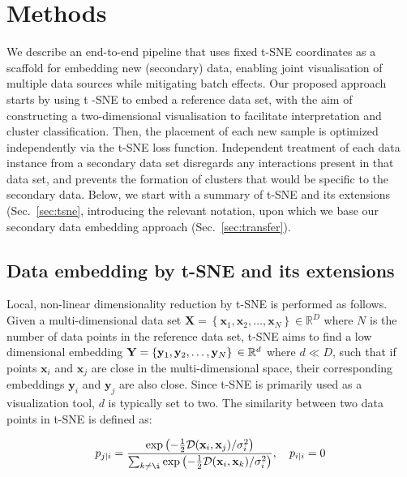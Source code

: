 \documentclass[runningheads]{llncs}
\begin{document}
\section{Methods}

We describe an end-to-end pipeline that uses fixed t-SNE coordinates as a scaffold for
embedding new (secondary) data, enabling joint visualisation of multiple data sources
while mitigating batch effects. Our proposed approach starts by using t\nobreakdash
-SNE to embed a reference data set, with the aim of constructing a
two-dimensional visualisation to facilitate interpretation and cluster
classification. Then, the placement of each new sample is
optimized independently via the
t\nobreakdash -SNE loss function. Independent treatment of each data instance from
a secondary data set disregards any interactions present in that data set, and
prevents the formation of clusters that would be specific to the secondary data. Below, we start
with a summary of t-SNE and its extensions (Sec.~\ref{sec:tsne}, introducing
the relevant notation, upon which we base our secondary data embedding
approach (Sec.~\ref{sec:transfer}).


\subsection{Data embedding by t-SNE and its extensions\label{sec:tsne}}

Local, non-linear dimensionality reduction by t-SNE is performed as follows.
Given a multi-dimensional data set $\mathbf{X} =
\left \{ \mathbf{x}_1, \mathbf{x}_2, \dots, \mathbf{x}_N \right \} \in
\mathbb{R}^D$ where $N$ is the number of data points in the reference data set,
t-SNE aims to find a low dimensional embedding $\mathbf{Y} = \left \{
\mathbf{y}_1, \mathbf{y}_2, \dots, \mathbf{y}_N \right \} \\\in \mathbb{R}^d$
where $d \ll D$, such that if points $\mathbf{x}_i$ and $\mathbf{x}_j$ are
close in the multi-dimensional space, their corresponding embeddings
$\mathbf{y}_i$ and $\mathbf{y}_j$ are also close. Since t-SNE is primarily used
as a visualization tool, $d$ is typically set to two. The similarity between
two data points in t-SNE is defined as:

\begin{equation}
p_{j \mid i} = \frac{\exp \left ( -\frac{1}{2} \mathcal{D}(\mathbf{x}_i, \mathbf{x}_j ) / \sigma_i^2 \right )}
{\sum_{k \neq \i } \exp \left ( -\frac{1}{2} \mathcal{D}(\mathbf{x}_i, \mathbf{x}_k ) / \sigma_i^2 \right )}, \quad p_{i \mid i} = 0
\label{eq:gaussian_kernel}
\end{equation}
\end{document}
